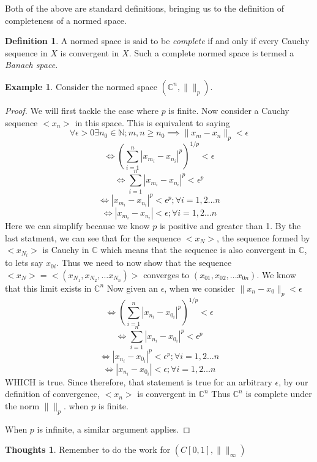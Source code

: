 \documentclass[12pt]{book}
\theoremstyle{definition}
\newtheorem*{defn}{Definition}
\newtheorem{eg}{Example}[chapter]
\newtheorem*{huh}{Thoughts}
\begin{document}
Both of the above are standard definitions, bringing us to the definition of completeness of a normed space.
\begin{defn}
    A normed space is said to be \textit{complete} if and only if every Cauchy sequence in $X$ is convergent in $X$. Such a complete normed space is termed a \textit{Banach space.}
\end{defn}
\begin{eg}
    Consider the normed space $(\mathbb{C}^n, \|\|_p)$. 
    \begin{proof}
        We will first tackle the case where $p$ is finite. Now consider a Cauchy sequence $<x_n>$ in this space. This is equivalent to saying $$\forall \epsilon > 0 \exists n_0 \in \mathbb{N}; m, n \geq n_0 \implies \| x_m - x_n \|_p < \epsilon$$
        $$\iff \left(\sum_{i = 1}^n |x_{m_i} - x_{n_i}|^p\right)^{1/p} < \epsilon$$
        $$\iff \sum_{i = 1}^n |x_{m_i} - x_{n_i}|^p < \epsilon^p$$
        $$\iff |x_{m_i} - x_{n_i}|^p < \epsilon^p; \forall i = 1,2 \ldots n$$
        $$\iff |x_{m_i} - x_{n_i}| < \epsilon; \forall i = 1,2 \ldots n$$
        Here we can simplify because we know $p$ is positive and greater than 1. 
        By the last statment, we can see that for the sequence $<x_N>$, the sequence formed by $<x_{N_i}>$ is Cauchy in $\mathbb{C}$ which means that the sequence is also convergent in $\mathbb{C}$, to lets say $x_{0i}$. Thus we need to now show that the sequence $<x_N> = <(x_{N_1}, x_{N_2}, \ldots x_{N_n})>$ converges to $(x_{01}, x_{02}, \ldots x_{0n})$. We know that this limit exists in $\mathbb{C}^n$
        Now given an $\epsilon$, when we consider $\| x_n - x_0 \|_p < \epsilon$
        $$ \iff \left(\sum_{i = 1}^n |x_{n_i} - x_{0_i}|^p\right)^{1/p} < \epsilon$$
        $$\iff \sum_{i = 1}^n |x_{n_i} - x_{0_i}|^p < \epsilon^p$$
        $$\iff |x_{n_i} - x_{0_i}|^p < \epsilon^p; \forall i = 1,2 \ldots n$$
        $$\iff |x_{n_i} - x_{0_i}| < \epsilon; \forall i = 1,2 \ldots n$$
        WHICH is true. Since therefore, that statement is true for an arbitrary $\epsilon$, by our definition of convergence, $<x_n>$ is convergent in $\mathbb{C}^n$
        Thus $\mathbb{C}^n$ is complete under the norm $\|\|_p$. when $p$ is finite.

        When $p$ is infinite, a similar argument applies. 
    \end{proof}
\end{eg}
\begin{huh}
    Remember to do the work for $(\mathit{C}[0,1], \|\|_{\infty})$ 
\end{huh}
\end{document}
